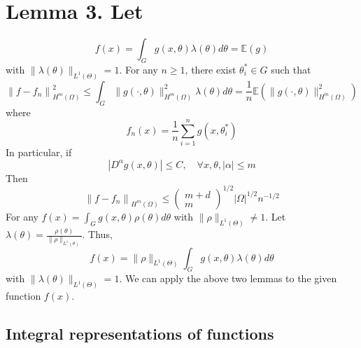 \documentclass[10pt]{article}
\begin{document}
\section{Lemma 3. Let}
$$
f(x)=\int_{G} g(x, \theta) \lambda(\theta) d \theta=\mathbb{E}(g)
$$
with $\|\lambda(\theta)\|_{L^{1}(\Theta)}=1$. For any $n \geq 1$, there exist $\theta_{i}^{*} \in G$ such that
$$
\left\|f-f_{n}\right\|_{H^{m}(\Omega)}^{2} \leq \int_{G}\|g(\cdot, \theta)\|_{H^{m}(\Omega)}^{2} \lambda(\theta) d \theta=\frac{1}{n} \mathbb{E}\left(\|g(\cdot, \theta)\|_{H^{m}(\Omega)}^{2}\right)
$$
where
$$
f_{n}(x)=\frac{1}{n} \sum_{i=1}^{n} g\left(x, \theta_{i}^{*}\right)
$$
In particular, if
$$
\left|D^{\alpha} g(x, \theta)\right| \leq C, \quad \forall x, \theta,|\alpha| \leq m
$$
Then
$$
\left\|f-f_{n}\right\|_{H^{m}(\Omega)} \leq\left(\begin{array}{c}
m+d \\
m
\end{array}\right)^{1 / 2}|\Omega|^{1 / 2} n^{-1 / 2}
$$
For any $f(x)=\int_{G} g(x, \theta) \rho(\theta) d \theta$ with $\|\rho\|_{L^{1}(\Theta)} \neq 1 .$ Let $\lambda(\theta)=\frac{\rho(\theta)}{\|\rho\|_{L^{1}(\theta)}} .$ Thus,
$$
f(x)=\|\rho\|_{L^{1}(\Theta)} \int_{G} g(x, \theta) \lambda(\theta) d \theta
$$
with $\|\lambda(\theta)\|_{L^{1}(\Theta)}=1 .$ We can apply the above two lemmas to the given function $f(x)$.

\subsection{Integral representations of functions}
\end{document}
